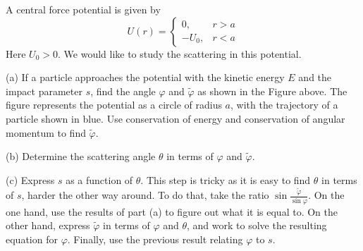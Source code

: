 \documentclass[12pt]{article}
\begin{document}
\begin{problem}{2}
A central force potential is given by
\begin{equation}
    U(r)=\begin{cases}
        0, & r>a\\
        -U_0, & r<a
    \end{cases}
\end{equation}
Here $U_0>0$. We would like to study the scattering in this potential.

(a) If a particle approaches the potential with the kinetic energy $E$ and the
impact parameter $s$, find the angle $\varphi$ and $\tilde{\varphi}$ as shown in
the Figure above. The figure represents the potential as a circle of radius $a$,
with the trajectory of a particle shown in blue. Use conservation of energy and
conservation of angular momentum to find $\tilde{\varphi}$.

(b) Determine the scattering angle $\theta$ in terms of $\varphi$ and
$\tilde{\varphi}$.

(c) Express $s$ as a function of $\theta$. This step is tricky as it is easy to
find $\theta$ in terms of $s$, harder the other way around. To do that, take the
ratio $\sin\frac{\tilde{\varphi}}{\sin\varphi}$. On the one hand, use the
results of part (a) to figure out what it is equal to. On the other hand,
express $\tilde{\varphi}$ in terms of $\varphi$ and $\theta$, and work to solve
the resulting equation for $\varphi$. Finally, use the previous result relating
$\varphi$ to $s$.


\end{problem}
\end{document}
